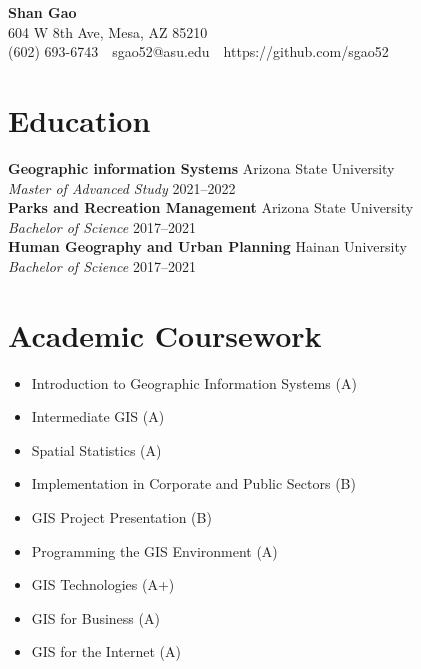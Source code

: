 \documentclass[11pt,a4paper]{article}
\makeatletter
\newcommand{\name}{Shan Gao}
\newcommand{\address}{604 W 8th Ave, Mesa, AZ 85210}
\newcommand{\phone}{(602) 693-6743}
\newcommand{\email}{sgao52@asu.edu}
\newcommand{\website}{https://github.com/sgao52}
\newcommand{\entry}[4]{\noindent\textbf{#1} \hfill #2\\ \textit{#3} \hfill #4 \vspace{7 pt}\\}
\makeatother
\begin{document}
\begin{center}
    {\LARGE \textbf{\name}}\\
    \vspace{0.2in}
    \address\\
    \vspace{0.05in}
    \phone \ \textbullet \ \email \ \textbullet \ \website
\end{center}

\section{Education}
\entry{Geographic information Systems}{Arizona State University}{Master of Advanced Study}{2021--2022}
\entry{Parks and Recreation Management}{Arizona State University}{Bachelor of Science}{2017--2021}
\entry{Human Geography and Urban Planning}{Hainan University}{Bachelor of Science}{2017--2021}



\section{Academic Coursework}
\begin{itemize}
    \item Introduction to Geographic Information Systems (A)
    \item Intermediate GIS (A)
    \item Spatial Statistics (A)
    \item Implementation in Corporate and Public Sectors (B)
    \item GIS Project Presentation (B)
    \item Programming the GIS Environment (A)
    \item GIS Technologies (A+)
    \item GIS for Business (A)
    \item GIS for the Internet (A)
\vspace{7pt}
\end{itemize}


\end{document}
